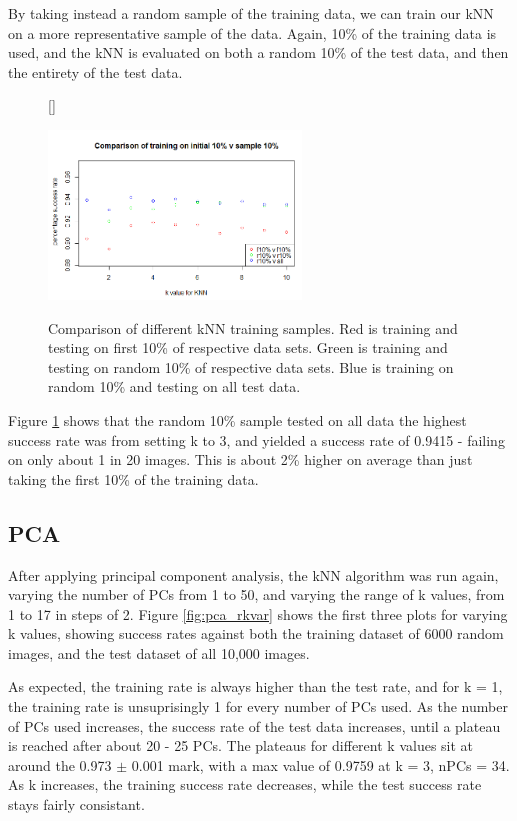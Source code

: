 \documentclass[11pt]{article} %
\begin{document}
By taking instead a random sample of the training data, we can train our kNN on a more representative sample of the data. Again, 10\% of the training data is used, and the kNN is evaluated on both a random 10\% of the test data, and then the entirety of the test data. 

\begin{figure}[htb!]
[\FBwidth]
{\caption{Comparison of different kNN training samples. Red is training and testing on first 10\% of respective data sets. Green is training and testing on random 10\% of respective data sets. Blue is training on random 10\% and testing on all test data.}\label{fig:init_kNN}}
{\includegraphics[width=0.6\textwidth]{10pc_training.png}}
\end{figure}



Figure \ref{fig:init_kNN} shows that the random 10\% sample tested on all data the highest success rate was from setting k to $3$, and yielded a success rate of 0.9415 - failing on only about 1 in 20 images. This is about 2\% higher on average than just taking the first 10\% of the training data. 





\subsection{PCA}

After applying principal component analysis, the kNN algorithm was run again, varying the number of PCs from 1 to 50, and varying the range of k values, from 1 to 17 in steps of 2. Figure \ref{fig:pca_rkvar} shows the first three plots for varying k values, showing success rates against both the training dataset of 6000 random images, and the test dataset of all 10,000 images. 

As expected, the training rate is always higher than the test rate, and for k = 1, the training rate is unsuprisingly 1 for every number of PCs used. As the number of PCs used increases, the success rate of the test data increases, until a plateau is reached after about 20 - 25 PCs. The plateaus for different k values sit at around the 0.973 $\pm$ 0.001 mark, with a max value of 0.9759 at k = 3, nPCs = 34. As k increases, the training success rate decreases, while the test success rate stays fairly consistant. 
\end{document}
